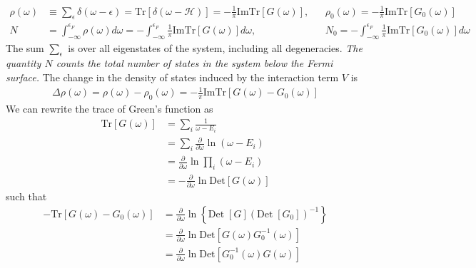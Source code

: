 \begin{equation}\begin{aligned}
	\rho(\omega) &\equiv \sum_\epsilon \delta(\omega - \epsilon) = \text{Tr}\left[ \delta(\omega - \mathcal{H}) \right] = - \frac{1}{\pi}\text{Im} \text{Tr}\left[ G(\omega) \right], && \rho_0(\omega) =  -\frac{1}{\pi}\text{Im} \text{Tr}\left[ G_0(\omega) \right]\\
	N &= \int_{-\infty}^{\epsilon_F} \rho(\omega) d\omega = - \int_{-\infty}^{\epsilon_F} \frac{1}{\pi}\text{Im} \text{Tr}\left[ G(\omega) \right]d\omega, && N_0 = - \int_{-\infty}^{\epsilon_F} \frac{1}{\pi}\text{Im} \text{Tr}\left[ G_0(\omega) \right]d\omega
\end{aligned}\end{equation}
The sum \(\sum_\epsilon\) is over all eigenstates of the system, including all degeneracies. \textit{The quantity \(N\) counts the total number of states in the system below the Fermi surface.} The change in the density of states induced by the interaction term \(V\) is
\begin{equation}\begin{aligned}
	\label{doschange}
	\Delta \rho\left( \omega \right)  = \rho\left( \omega \right) - \rho_0\left( \omega \right) = -\frac{1}{\pi}\text{Im} \text{Tr}\left[ G(\omega) - G_0(\omega) \right]
\end{aligned}\end{equation}
We can rewrite the trace of Green's function as
\begin{equation}\begin{aligned}
	\text{Tr}\left[G(\omega)\right] &= \sum_i \frac{1}{\omega - E_i} \\
	&= \sum_i \frac{\partial{}}{\partial{\omega}} \ln \left(\omega - E_i\right) \\
	&= \frac{\partial{}}{\partial{\omega}} \ln \prod_i\left(\omega - E_i\right) \\
	&= -\frac{\partial{}}{\partial{\omega}} \ln \text{Det}\left[G(\omega)\right] 
\end{aligned}\end{equation}
such that
\begin{equation}\begin{aligned}
	-\text{Tr}\left[G(\omega) - G_0(\omega)\right] &= \frac{\partial{}}{\partial{\omega}} \ln \left\{\text{Det}\;\left[G\right]\left(\text{Det}\;\left[G_0\right]\right)^{-1}\right\}\\
						       &= \frac{\partial{}}{\partial{\omega}} \ln \text{Det}\left[G(\omega)G_0^{-1}(\omega)\right]\\
	&= \frac{\partial{}}{\partial{\omega}} \ln \text{Det}\left[G_0^{-1}(\omega)G(\omega)\right]
\end{aligned}\end{equation}
